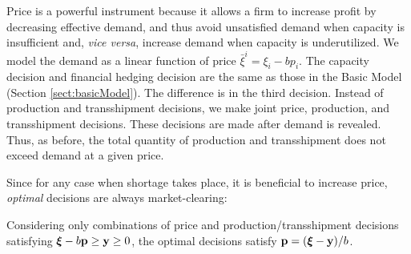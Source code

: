 \documentclass[mnsc,nonblindrev,copyedit]{informs2_wz} %
\newcommand{\proof}{\noindent{\bf Proof: } }
\newcommand{\qed}{ \hfill $\Box$ }
\newcommand{\OUT}[1]{}
\newcommand{\xiv}{\mbox{\boldmath$\xi$}}
\begin{document}
Price is a powerful instrument because it allows a firm to increase profit by decreasing effective demand, and thus avoid unsatisfied demand when capacity is insufficient and, {\it vice versa}, increase demand when capacity is underutilized.  We model the demand as a linear function of price $\bar{\xi}^i = \xi_i - bp_i$.  The capacity decision and financial hedging decision are the same as those in the Basic Model (Section \ref{sect:basicModel}).  The difference is in the third decision.  Instead of production and transshipment decisions, we make joint price, production, and transshipment decisions.  These decisions are made after demand is revealed.  Thus, as before, the total quantity of production and transshipment does not exceed demand at a given price.
\OUT{
The problem can be formulated as follows:
\begin{eqnarray}
f(s,\bold{k,\xi}) &=& \max_{(\bold p, \bold y, \bold x) \in
B(\bold{k},\xiv)} J(\bold p, \bold y,\bold x) \label{eqn:fPrice}\\
J(\bold {p,y,x}) &=& (p^d-c)y^d + s(p^o-c)y^o + (s-1)c(x^o -x^d)\nonumber\\&& -t(x^o + x^d) \\
B(\bold{k},\xiv)& = &\{(\bold {p,y,x}): \; \bold p \geq 0,\;\bold
y \geq 0, \; \bold x \geq 0,\;  \bold y\leq \xiv-b\bold p, \nonumber \\
&& y_i \leq k_i+x_i-x_{j\neq i} \; \forall i \in \{o,d\} \forall j
\in \{o,d\}\}
\end{eqnarray}



The price and production decision problem cannot be solved independently, as choice of price determines the feasible region for production and transshipment decisions.  Taking advantage of the fact that it is always possible to avoid over-production, we further simplify the formulation by noting that

}
Since for any case when shortage takes place, it is beneficial to increase price, {\em optimal} decisions are always market-clearing:


{\lemma Considering only combinations of price and production/transshipment decisions satisfying $\xiv-b\bold p\geq \bold y \geq 0$, the optimal decisions satisfy $\bold p = (\xiv-\bold y)/b$. \label{lemma:priceSol}}


\end{document}
